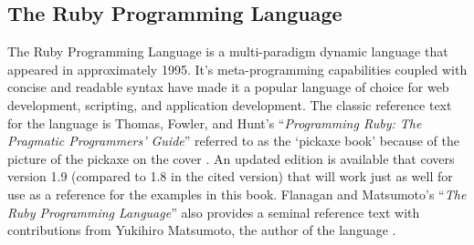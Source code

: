 \begin{bibunit}
% 
% 
\subsection{The Ruby Programming Language}
The Ruby Programming Language is a multi-paradigm dynamic language that appeared in approximately 1995. It's meta-programming capabilities coupled with concise and readable syntax have made it a popular language of choice for web development, scripting, and application development. The classic reference text for the language is Thomas, Fowler, and Hunt's ``\emph{Programming Ruby: The Pragmatic Programmers' Guide}'' referred to as the `pickaxe book' because of the picture of the pickaxe on the cover \cite{Thomas2004}. An updated edition is available that covers version 1.9 (compared to 1.8 in the cited version) that will work just as well for use as a reference for the examples in this book. Flanagan and Matsumoto's ``\emph{The Ruby Programming Language}'' also provides a seminal reference text with contributions from Yukihiro Matsumoto, the author of the language \cite{Flanagan2008}.


\renewcommand{\bibsection}{\section{\bibname}}
\putbib
\end{bibunit}
